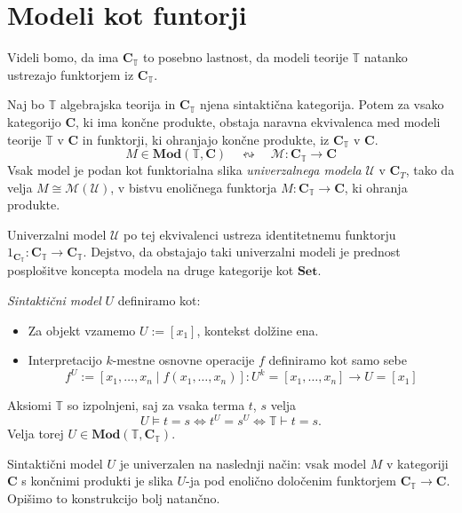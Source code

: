\documentclass[../kategoricna_logika.tex]{subfiles}
\begin{document}
\section{Modeli kot funtorji}
%
Videli bomo, da ima $\mathbf{C}_{\mathbb{T}}$ to posebno lastnost, da modeli
teorije $\mathbb{T}$ natanko ustrezajo funktorjem iz $\mathbf{C}_{\mathbb{T}}$.
\begin{izrek}
\label{sec:modeli-kot-funtorji}
Naj bo $\mathbb{T}$ algebrajska teorija in $\mathbf{C}_{\mathbb{T}}$ njena
sintaktična kategorija. Potem za vsako kategorijo $\mathbf{C}$, ki ima končne
produkte, obstaja naravna ekvivalenca med modeli teorije $\mathbb{T}$ v
$\mathbf{C}$ in funktorji, ki ohranjajo končne produkte, iz
$\mathbf{C}_{\mathbb{T}}$ v $\mathbf{C}$.
$$M \in \mathbf{Mod}(\mathbb{T}, \mathbf{C})\quad \leftrightsquigarrow \quad \mathcal{M} : \mathbf{C}_\mathbb{T} \to \mathbf{C}$$
Vsak model je podan kot funktorialna slika \emph{univerzalnega modela}
$\mathcal{U}$ v $\mathbf{C}_T$, tako da velja
$M \cong \mathcal{M}(\mathcal{U})$, v bistvu enoličnega funktorja
$M : \mathbf{C}_{\mathbb{T}} \to \mathbf{C}$, ki ohranja produkte.
\end{izrek}
\begin{opomba}
  Univerzalni model $\mathcal{U}$ po tej ekvivalenci ustreza identitetnemu
  funktorju $1_{\mathbf{C}_{\mathbb{T}}} : \mathbf{C}_{\mathbb{T}} \to \mathbf{C}_{\mathbb{T}}$.
  Dejstvo, da obstajajo taki univerzalni modeli je prednost posplošitve
  koncepta modela na druge kategorije kot $\mathbf{Set}$.
\end{opomba}
%
\begin{definicija}
\emph{Sintaktični model} $U$ definiramo kot:
\begin{itemize}
\item Za objekt vzamemo $U := [x_1]$, kontekst dolžine ena.
%
\item Interpretacijo $k$-mestne osnovne operacije $f$ definiramo kot
  samo sebe
$$f^U := [x_1, \ldots, x_n \mid f(x_1, \ldots, x_n)] : U^k = [x_1, \ldots, x_n] \to U = [x_1]$$
\end{itemize}
%
Aksiomi $\mathbb{T}$ so izpolnjeni, saj za vsaka terma $t$, $s$ velja
$$U \models t = s \Longleftrightarrow t^U = s^U \Longleftrightarrow \mathbb{T} \vdash t = s.$$
Velja torej
$U \in \mathbf{Mod}(\mathbb{T}, \mathbf{C}_\mathbb{T})$.
\end{definicija}
%
Sintaktični model $U$ je univerzalen na naslednji način:
vsak model $M$ v kategoriji $\mathbf{C}$ s končnimi produkti je
slika $U$-ja pod enolično določenim funktorjem $\mathbf{C}_{\mathbb{T}} \to \mathbf{C}$.
Opišimo to konstrukcijo bolj natančno.
\end{document}
